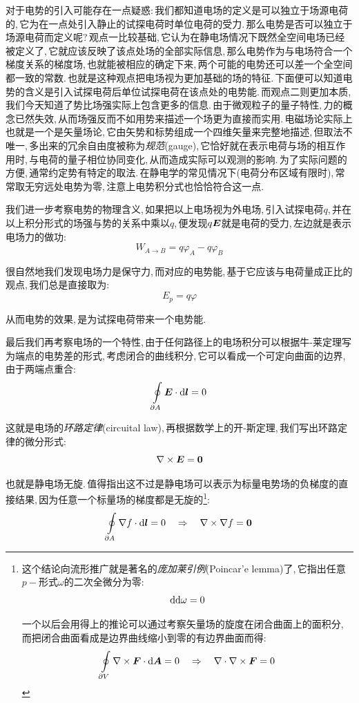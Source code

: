 对于电势的引入可能存在一点疑惑:\,我们都知道电场的定义是可以独立于场源电荷的,\,它为在一点处引入静止的试探电荷时单位电荷的受力.\,那么电势是否可以独立于场源电荷而定义呢?\,观点一比较基础,\,它认为在静电场情况下既然全空间电场已经被定义了,\,它就应该反映了该点处场的全部实际信息,\,那么电势作为与电场符合一个梯度关系的梯度场,\,也就能被相应的确定下来,\,两个可能的电势还可以差一个全空间都一致的常数.\,也就是这种观点把电场视为更加基础的场的特征.\,下面便可以知道电势的含义是引入试探电荷后单位试探电荷在该点处的电势能.\,而观点二则更加本质,\,我们今天知道了势比场强实际上包含更多的信息.\,由于微观粒子的量子特性,\,力的概念已然失效,\,从而场强反而不如用势来描述一个场更为直接而实用.\,电磁场论实际上也就是一个是矢量场论,\,它由矢势和标势组成一个四维矢量来完整地描述,\,但取法不唯一,\,多出来的冗余自由度被称为\emph{规范}(gauge),\,它恰好就在表示电荷与场的相互作用时,\,与电荷的量子相位协同变化,\,从而造成实际可以观测的影响.\,为了实际问题的方便,\,通常约定势有特定的取法.\,在静电学的常见情况下(电荷分布区域有限时),\,常常取无穷远处电势为零,\,注意上电势积分式也恰恰符合这一点.

我们进一步考察电势的物理含义,\,如果把以上电场视为外电场,\,引入试探电荷$q$,\,并在以上积分形式的场强与势的关系中乘以$q$,\,便发现$q\boldsymbol{E}$就是电荷的受力,\,左边就是表示电场力的做功:
\[W_{A\to B}=q\varphi_A-q\varphi_B\]

很自然地我们发现电场力是保守力,\,而对应的电势能,\,基于它应该与电荷量成正比的观点,\,我们总是直接取为:
\[E_p=q\varphi\]

从而电势的效果,\,是为试探电荷带来一个电势能.

最后我们再考察电场的一个特性,\,由于任何路径上的电场积分可以根据牛-莱定理写为端点的电势差的形式,\,考虑闭合的曲线积分,\,它可以看成一个可定向曲面的边界,\,由于两端点重合:
\[\oint\limits_{\partial A}\boldsymbol{E}\cdot\textrm{d} \boldsymbol{l}=0\]

这就是电场的\emph{环路定律}(circuital law),\,再根据数学上的开-斯定理,\,我们写出环路定律的微分形式:
\[\nabla\times\boldsymbol{E}=\boldsymbol{0}\]

也就是静电场无旋.\,值得指出这不过是静电场可以表示为标量电势场的负梯度的直接结果,\,因为任意一个标量场的梯度都是无旋的\footnote{这个结论向流形推广就是著名的\emph{庞加莱引例}(Poincar'e lemma)了,\,它指出任意$p-$形式$\omega$的二次全微分为零:
\[\textrm{d}\textrm{d}\omega=0\]

一个以后会用得上的推论可以通过考察矢量场的旋度在闭合曲面上的面积分,\,而把闭合曲面看成是边界曲线缩小到零的有边界曲面而得:
\[\oint\limits_{\partial V}\nabla \times \boldsymbol{F}\cdot\textrm{d} \boldsymbol{A}=0\quad \Rightarrow \quad \nabla\cdot\nabla \times\boldsymbol{F}=0\]}:
\[\oint\limits_{\partial A}\nabla f\cdot\textrm{d} \boldsymbol{l}=0\quad \Rightarrow \quad \nabla\times\nabla f=\boldsymbol{0}\]

